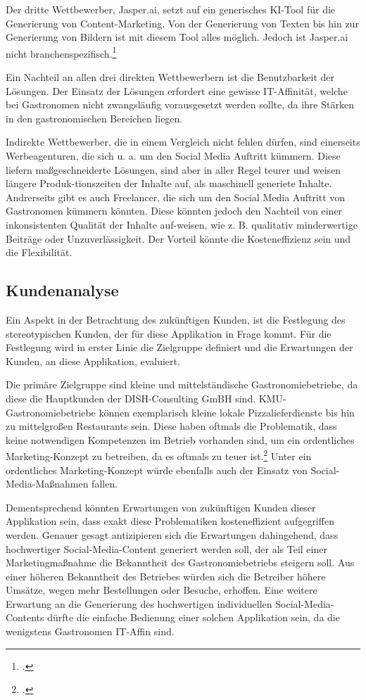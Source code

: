 Der dritte Wettbewerber, Jasper.ai, setzt auf ein generisches KI-Tool für die Generierung von Content-Marketing.
Von der Generierung von Texten bis hin zur Generierung von Bildern ist mit diesem Tool alles möglich.
Jedoch ist Jasper.ai nicht branchenspezifisch.\footcite{jasper_ai_product_marketers}

Ein Nachteil an allen drei direkten Wettbewerbern ist die Benutzbarkeit der Lösungen.
Der Einsatz der Lösungen erfordert eine gewisse IT-Affinität, welche bei Gastronomen nicht zwangsläufig vorausgesetzt werden sollte, da ihre Stärken in den gastronomischen Bereichen liegen.

Indirekte Wettbewerber, die in einem Vergleich nicht fehlen dürfen, sind einerseits Werbeagenturen, die sich u. a. um den Social Media Auftritt kümmern. Diese liefern maßgeschneiderte Lösungen, sind aber in aller Regel teurer und weisen längere Produk-tionszeiten der Inhalte auf, als maschinell generiete Inhalte.
Andrerseits gibt es auch Freelancer, die sich um den Social Media Auftritt von Gastronomen kümmern könnten.
Diese könnten jedoch den Nachteil von einer inkonsistenten Qualität der Inhalte auf-weisen, wie z. B. qualitativ minderwertige Beiträge oder Unzuverlässigkeit.
Der Vorteil könnte die Kosteneffizienz sein und die Flexibilität.

\subsection{Kundenanalyse}
Ein Aspekt in der Betrachtung des zukünftigen Kunden, ist die Festlegung des stereotypischen Kunden, der für diese Applikation in Frage kommt.
Für die Festlegung wird in erster Linie die Zielgruppe definiert und die Erwartungen der Kunden, an diese Applikation, evaluiert.

Die primäre Zielgruppe sind kleine und mittelständische Gastronomiebetriebe, da diese die Hauptkunden der DISH-Consulting GmBH sind.
KMU-Gastronomiebetriebe können exemplarisch kleine lokale Pizzalieferdienste bis hin zu mittelgroßen Restaurants sein.
Diese haben oftmals die Problematik, dass keine notwendigen Kompetenzen im Betrieb vorhanden sind, um ein ordentliches Marketing-Konzept zu betreiben, da es oftmals zu teuer ist.\footcite{restroworks2024}
Unter ein ordentliches Marketing-Konzept würde ebenfalls auch der Einsatz von Social-Media-Maßnahmen fallen.

Dementsprechend könnten Erwartungen von zukünftigen Kunden dieser Applikation sein, dass exakt diese Problematiken kosteneffizient aufgegriffen werden.
Genauer gesagt antizipieren sich die Erwartungen dahingehend, dass hochwertiger Social-Media-Content generiert werden soll, der als Teil einer Marketingmaßnahme die Bekanntheit des Gastronomiebetriebs steigern soll.
Aus einer höheren Bekanntheit des Betriebes würden sich die Betreiber höhere Umsätze, wegen mehr Bestellungen oder Besuche, erhoffen.
Eine weitere Erwartung an die Generierung des hochwertigen individuellen Social-Media-Contents dürfte die einfache Bedienung einer solchen Applikation sein, da die wenigstens Gastronomen IT-Affin sind.

